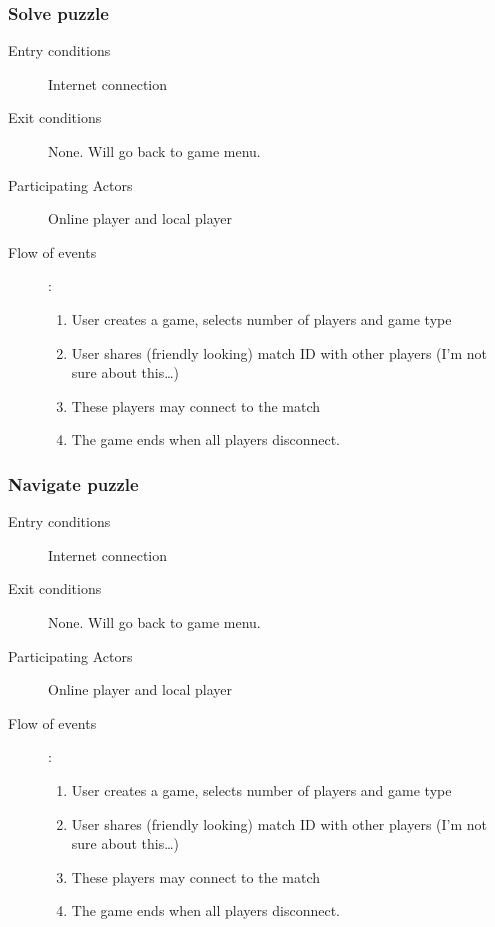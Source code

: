 \documentclass[12pt]{article}
\begin{document}
    \subsubsection{Solve puzzle}
    \begin{description}
        \item[Entry conditions] Internet connection
        \item[Exit conditions] None. Will go back to game menu.
        \item[Participating Actors] Online player and local player
        \item[Flow of events]:
            \begin{enumerate}
                \item User creates a game, selects number of players and game
                    type
                \item User shares (friendly looking) match ID with other
                    players (I’m not sure about this…)
                \item These players may connect to the match
                \item The game ends when all players disconnect.
            \end{enumerate}
    \end{description}


    \subsubsection{Navigate puzzle}
    \begin{description}
        \item[Entry conditions] Internet connection
        \item[Exit conditions] None. Will go back to game menu.
        \item[Participating Actors] Online player and local player
        \item[Flow of events]:
            \begin{enumerate}
                \item User creates a game, selects number of players and game
                    type
                \item User shares (friendly looking) match ID with other
                    players (I’m not sure about this…)
                \item These players may connect to the match
                \item The game ends when all players disconnect.
            \end{enumerate}
    \end{description}
\end{document}
